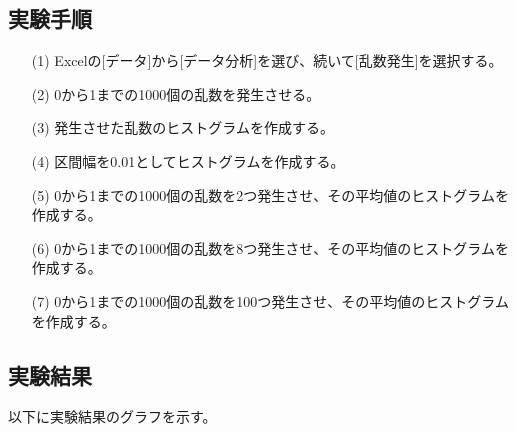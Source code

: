 \documentclass[12pt]{jarticle}
\begin{document}
\subsection{実験手順}
\begin{itemize}
    \item[(1)] Excelの[データ]から[データ分析]を選び、続いて[乱数発生]を選択する。
    \item[(2)] 0から1までの1000個の乱数を発生させる。
    \item[(3)] 発生させた乱数のヒストグラムを作成する。
    \item[(4)] 区間幅を0.01としてヒストグラムを作成する。
    \item[(5)] 0から1までの1000個の乱数を2つ発生させ、その平均値のヒストグラムを作成する。
    \item[(6)] 0から1までの1000個の乱数を8つ発生させ、その平均値のヒストグラムを作成する。
    \item[(7)] 0から1までの1000個の乱数を100つ発生させ、その平均値のヒストグラムを作成する。
\end{itemize}

\subsection{実験結果}
以下に実験結果のグラフを示す。
\end{document}
